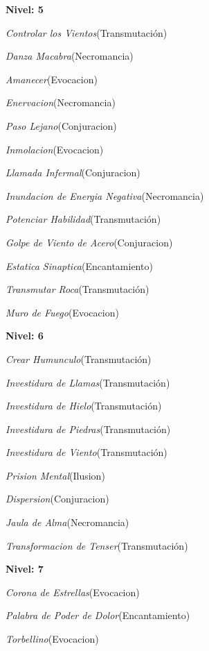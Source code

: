 \documentclass[a4paper,twocolumn,openany,10pt]{dndbook}
\begin{document}
\begin{list}{}{}
	\item \textbf{Nivel: 5}
	\begin{list}{}{}
		\item \textit{Controlar los Vientos}(Transmutación)
		\item \textit{Danza Macabra}(Necromancia)
		\item \textit{Amanecer}(Evocacion)
		\item \textit{Enervacion}(Necromancia)
		\item \textit{Paso Lejano}(Conjuracion)
		\item \textit{Inmolacion}(Evocacion)
		\item \textit{Llamada Infermal}(Conjuracion)
		\item \textit{Inundacion de Energia Negativa}(Necromancia)
		\item \textit{Potenciar Habilidad}(Transmutación)
		\item \textit{Golpe de Viento de Acero}(Conjuracion)
		\item \textit{Estatica Sinaptica}(Encantamiento)
		\item \textit{Transmutar Roca}(Transmutación)
		\item \textit{Muro de Fuego}(Evocacion)
	\end{list}

	\item \textbf{Nivel: 6}
	\begin{list}{}{}
		\item \textit{Crear Humunculo}(Transmutación)
		\item \textit{Investidura de Llamas}(Transmutación)
		\item \textit{Investidura de Hielo}(Transmutación)
		\item \textit{Investidura de Piedras}(Transmutación)
		\item \textit{Investidura de Viento}(Transmutación)
		\item \textit{Prision Mental}(Ilusion)
		\item \textit{Dispersion}(Conjuracion)
		\item \textit{Jaula de Alma}(Necromancia)
		\item \textit{Transformacion de Tenser}(Transmutación)
	\end{list}

	\item \textbf{Nivel: 7}
	\begin{list}{}{}
		\item \textit{Corona de Estrellas}(Evocacion)
		\item \textit{Palabra de Poder de Dolor}(Encantamiento)
		\item \textit{Torbellino}(Evocacion)
	\end{list}


\end{list}
\end{document}
